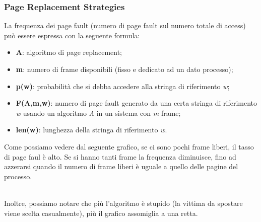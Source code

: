 \documentclass{article}
\begin{document}
			\subsubsection{Page Replacement Strategies}
				La frequenza dei page fault (numero di page fault sul numero totale di access) può essere espressa con la seguente formula:
				\begin{figure}[ht!]
				\end{figure}
				\begin{itemize}
					\item \textbf{A}: algoritmo di page replacement;
					\item \textbf{m}: numero di frame disponibili (fisso e dedicato ad un dato processo);
					\item \textbf{p(w)}: probabilità che si debba accedere alla stringa di riferimento \textit{w};
					\item \textbf{F(A,m,w)}: numero di page fault generato da una certa stringa di riferimento \textit{w} usando un  algoritmo \textit{A} in un sistema con \textit{m} frame;
					\item \textbf{len(w)}: lunghezza della stringa di riferimento \textit{w}.
				\end{itemize}
				Come possiamo vedere dal seguente grafico, se ci sono pochi frame liberi, il tasso di page faul è alto. Se si hanno tanti frame la frequenza diminuisce, fino ad azzerarsi quando il numero di frame liberi è uguale a quello delle pagine del processo.
				\begin{figure}[ht!]
				\end{figure}
				\\Inoltre, possiamo notare che più l'algoritmo è stupido (la vittima da spostare viene scelta casualmente), più il grafico assomiglia a una retta.
\end{document}
